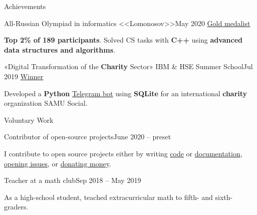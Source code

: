 \documentclass{resume} %
\begin{document}
\begin{rSection}{Achievements}
    \begin{rSubsection}
        {All-Russian Olympiad in informatics <<Lomonosov>>}{May 2020}
        {\href{https://drive.google.com/file/d/1IZ79oAVpzXzu7v7-jUK-btdeVrDk8Che/view?usp=sharing}{Gold medalist}}{}
    \item \textbf{Top 2\% of 189 participants}. Solved CS tasks with \textbf{C++} using \textbf{advanced data structures and algorithms}.
    \end{rSubsection}

    \begin{rSubsection}
        {«Digital Transformation of the \textbf{Charity} Sector» IBM \& HSE Summer School}{Jul 2019}
        {\href{https://www.hse.ru/en/news/298686356.html}{Winner}}{}
    \item Developed a \textbf{Python} \href{https://github.com/SenchoPens/samumoskva_bot}{Telegram bot} using \textbf{SQLite} for an international \textbf{charity} organization SAMU Social.
    \end{rSubsection}
\end{rSection}

\begin{rSection}{Voluntary Work}
    \begin{rSubsection}{Contributor of open-source projects}{June 2020 -- preset}{}{}
    \item I contribute to open source projects either by writing
        \href{https://github.com/darkkeks/kks/pull/125/files}{code} or
        \href{https://github.com/hyperledger/fabric-docs-i18n/pull/80}{documentation},
        \href{https://github.com/search?q=is\%3Aopen+is\%3Aissue+author\%3ASenchoPens+archived\%3Afalse&type=}{opening issues},
        or \href{https://opencollective.com/guest-d7d943a1}{donating money}.
    \end{rSubsection}
    \begin{rSubsection}{Teacher at a math club}{Sep 2018 -- May 2019}{}{}
    \item As a high-school student, teached extracurricular math to fifth- and sixth-graders.
    \end{rSubsection}
\end{rSection}





\end{document}
